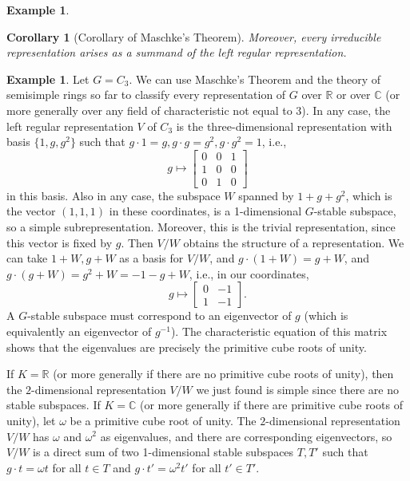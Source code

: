 \documentclass{amsart}[12pt]
\newcommand{\R}{{\mathbb{R}}}
\newcommand{\C}{\mathbb{C}}
\numberwithin{equation}{section}
\theoremstyle{plain} %
\newtheorem{cor}[equation]{Corollary}
\theoremstyle{definition}
\newtheorem{ex}[equation]{Example}
\theoremstyle{remark}
\begin{document}
\begin{ex}
\begin{cor}[Corollary of Maschke's Theorem]
Moreover, every irreducible representation arises as a summand of the left regular
           representation.
             \end{cor}
             
             \begin{ex} Let $G=C_3$. We can use Maschke's Theorem and the theory of semisimple rings so far to classify every representation of $G$ over $\R$ or over $\C$ (or more generally over any field of characteristic not equal to 3). In any case, the left regular representation $V$ of $C_3$ is the three-dimensional representation with basis $\{1,g,g^2\}$ such that $g\cdot 1 = g, g\cdot g=g^2, g\cdot g^2 =1$, i.e.,
             \[ g \mapsto \begin{bmatrix} 0 & 0 & 1 \\ 1 & 0 & 0 \\ 0 & 1 & 0\end{bmatrix}\]
             in this basis. Also in any case, the subspace $W$ spanned by $1+g+g^2$, which is the vector $(1,1,1)$ in these coordinates, is a 1-dimensional $G$-stable subspace, so a simple subrepresentation. Moreover, this is the trivial representation, since this vector is fixed by $g$. Then $V/W$ obtains the structure of a representation. We can take $1+W,g+W$ as a basis for $V/W$, and $g\cdot (1+W) = g+W$, and $g\cdot (g+W) = g^2+W = -1-g +W$, i.e., in our coordinates,
             \[ g\mapsto \begin{bmatrix} 0 & -1 \\ 1 & -1 \end{bmatrix}.\]
            A $G$-stable subspace must correspond to an eigenvector of $g$ (which is equivalently an eigenvector of $g^{-1}$). The characteristic equation of this matrix shows that the eigenvalues are precisely the primitive cube roots of unity. 
            
            If $K=\R$ (or more generally if there are no primitive cube roots of unity), then the $2$-dimensional representation $V/W$ we just found is simple since there are no stable subspaces.              
                         If $K=\C$ (or more generally if there are primitive cube roots of unity), let $\omega$ be a primitive cube root of unity. The $2$-dimensional representation $V/W$ has $\omega$ and $\omega^2$ as eigenvalues, and there are corresponding eigenvectors, so $V/W$ is a direct sum of two 1-dimensional stable subspaces $T, T'$ such that $g\cdot t= \omega t$ for all $t\in T$ and $g\cdot t' = \omega^2 t'$ for all $t'\in T'$. 
              

\end{ex}
\end{ex}
\end{document}
